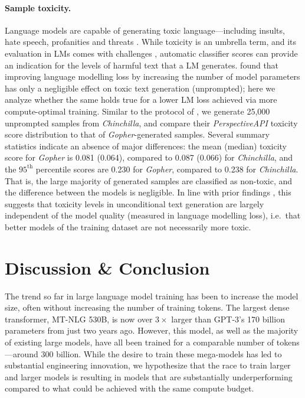\documentclass[11pt, a4paper, logo, copyright, nonumbering]{deepmind}
\newcommand{\gopher}{\textit{Gopher}\xspace}
\newcommand{\chinchilla}{\textit{Chinchilla}\xspace}
\newcommand{\mtnlg}{MT-NLG 530B\xspace}
\begin{document}
\paragraph{Sample toxicity.} 
Language models are capable of generating toxic language---including insults, hate speech, profanities and threats \citep{gehman2020realtoxicityprompts,rae2021gopher}.
While toxicity is an umbrella term, and its evaluation in LMs comes with challenges \citep{xu2021detoxifying,welbl2021challenges}, automatic classifier scores can provide an indication for the levels of harmful text that a LM generates. 
\citet{rae2021gopher} found that improving language modelling loss by increasing the number of model parameters has only a negligible effect on toxic text generation (unprompted); here we analyze whether the same holds true for a lower LM loss achieved via more compute-optimal training.
Similar to the protocol of \citet{rae2021gopher}, we generate 25,000 unprompted samples from \chinchilla, and compare their \textit{PerspectiveAPI} toxicity score distribution to that of \gopher-generated samples.
Several summary statistics indicate an absence of major differences:
the mean (median) toxicity score for \gopher is 0.081 (0.064), compared to 0.087 (0.066) for \chinchilla, and the $95^{\textrm{th}}$ percentile scores are 0.230 for \gopher, compared to 0.238 for \chinchilla. 
That is, the large majority of generated samples are classified as non-toxic, and the difference between the models is negligible.
In line with prior findings \citep{rae2021gopher}, this suggests that toxicity levels in unconditional text generation are largely independent of the model quality (measured in language modelling loss), i.e.~that better models of the training dataset are not necessarily more toxic.

\section{Discussion \& Conclusion}
The trend so far in large language model training has been to increase the model size, often without increasing the number of training tokens. 
The largest dense transformer, \mtnlg, is now over $3 \times$ larger than GPT-3's 170 billion parameters from just two years ago.
However, this model, as well as the majority of existing large models, have all been trained for a comparable number of tokens---around 300 billion.
While the desire to train these mega-models has led to substantial engineering innovation, we hypothesize that the race to train larger and larger models is resulting in models that are substantially underperforming compared to what could be achieved with the same compute budget.
\end{document}

